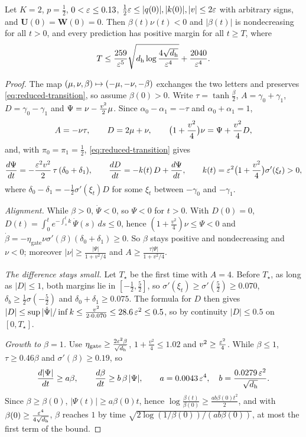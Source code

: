 \begin{proposition}
\label{prop:J-half}
Let $K=2$, $p=\frac12$, $0<\varepsilon\le0.13$, $\frac12\varepsilon\le|q(0)|,|k(0)|,|v|\le2\varepsilon$ with arbitrary signs, and $\mathbf U(0)=\mathbf W(0)=0$. Then
$\beta(t)\nu(t)<0$ and $|\beta(t)|$ is nondecreasing for all $t>0$, and every prediction has positive margin for all $t\ge T$, where
\[
 T\le\frac{259}{\varepsilon^5}\sqrt{d_{\mathrm h}\log\frac{4\sqrt{d_{\mathrm h}}}{\varepsilon^4}}+\frac{2040}{\varepsilon^4}.
\]
\end{proposition}

\begin{proof}
The map $(\mu,\nu,\beta)\mapsto(-\mu,-\nu,-\beta)$ exchanges the two letters and preserves \cref{eq:reduced-transition}, so assume $\beta(0)>0$. Write
$\tau=\tanh\frac{\beta}{2}$, $A=\gamma_0+\gamma_1$, $D=\gamma_0-\gamma_1$ and $\Psi=\nu-\frac{v^2}{2}\mu$. Since $\alpha_0-\alpha_1=-\tau$ and $\alpha_0+\alpha_1=1$,
\[
 A=-\nu\tau,\qquad D=2\cnt+\nu,\qquad \bigl(1+\tfrac{v^2}{4}\bigr)\nu=\Psi+\tfrac{v^2}{4}D,
\]
and, with $\pi_0=\pi_1=\frac12$, \cref{eq:reduced-transition} gives
\[
 \ddt{\Psi}=-\frac{\initscale^2v^2}{2}\,\tau\,(\delta_0+\delta_1),\qquad
 \ddt{D}=-k(t)\,D+\ddt{\Psi},\qquad k(t)=\initscale^2\bigl(1+\tfrac{v^2}{4}\bigr)\sigma'(\xi_t)>0,
\]
where $\delta_0-\delta_1=-\frac12\sigma'(\xi_t)D$ for some $\xi_t$ between $-\gamma_0$ and $-\gamma_1$.

\emph{Alignment.} While $\beta>0$, $\dot\Psi<0$, so $\Psi<0$ for $t>0$. With $D(0)=0$, $D(t)=\int_0^te^{-\int_s^tk}\,\dot\Psi(s)\,ds\le0$, hence
$(1+\frac{v^2}{4})\nu\le\Psi<0$ and $\dot\beta=-\eta_{\mathrm{gate}}\nu\sigma'(\beta)(\delta_0+\delta_1)\ge0$. So $\beta$ stays positive and nondecreasing and $\nu<0$; moreover
$|\nu|\ge\frac{|\Psi|}{1+v^2/4}$ and $A\ge\frac{\tau|\Psi|}{1+v^2/4}$.

\emph{The difference stays small.} Let $T_\star$ be the first time with $A=4$. Before $T_\star$, as long as $|D|\le1$, both margins lie in $[-\frac12,\frac52]$, so
$\sigma'(\xi_t)\ge\sigma'(\frac52)\ge0.070$, $\delta_b\ge\frac12\sigma(-\frac52)$ and $\delta_0+\delta_1\ge0.075$. The formula for $D$ then gives
$|D|\le\sup|\dot\Psi|/\inf k\le\frac{v^2}{2\cdot0.070}\le28.6\,\varepsilon^2\le0.5$, so by continuity $|D|\le0.5$ on $[0,T_\star]$.

\emph{Growth to $\beta=1$.} Use $\eta_{\mathrm{gate}}\ge\frac{2\varepsilon^2\beta}{\sqrt{d_{\mathrm h}}}$, $1+\frac{v^2}{4}\le1.02$ and $v^2\ge\frac{\varepsilon^2}{4}$. While $\beta\le1$, $\tau\ge0.46\beta$ and $\sigma'(\beta)\ge0.19$, so
\[
 \ddt{|\Psi|}\ge a\beta,\qquad \ddt{\beta}\ge b\,\beta\,|\Psi|,\qquad a=0.0043\,\initscale^4,\quad b=\frac{0.0279\,\initscale^2}{\sqrt{d_{\mathrm h}}}.
\]
Since $\beta\ge\beta(0)$, $|\Psi(t)|\ge a\beta(0)t$, hence $\log\frac{\beta(t)}{\beta(0)}\ge\frac{ab\beta(0)t^2}{2}$, and with $\beta(0)\ge\frac{\varepsilon^4}{4\sqrt{d_{\mathrm h}}}$, $\beta$ reaches $1$ by time
$\sqrt{2\log(1/\beta(0))/(ab\beta(0))}$, at most the first term of the bound.


\end{proof}
